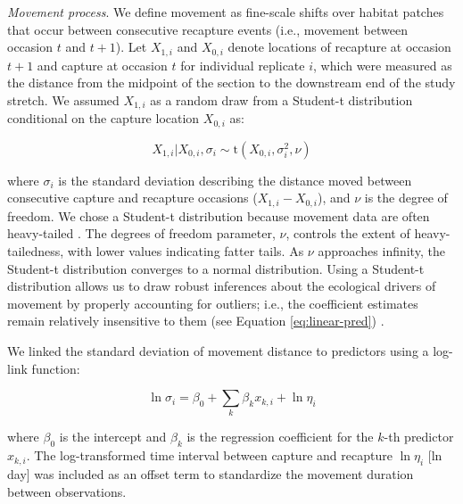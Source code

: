\documentclass[11pt, class=article, crop=false]{standalone}
\begin{document}
\textit{Movement process}. We define movement as fine-scale shifts over habitat patches that occur between consecutive recapture events (i.e., movement between occasion $t$ and $t+1$). Let $X_{1,i}$ and $X_{0,i}$ denote locations of recapture at occasion $t+1$ and capture at occasion $t$ for individual replicate $i$, which were measured as the distance from the midpoint of the section to the downstream end of the study stretch. We assumed $X_{1,i}$ as a random draw from a Student-t distribution conditional on the capture location $X_{0,i}$ as:    

\begin{equation}
    X_{1, i}|X_{0, i}, \sigma_i \sim \text{t}(X_{0, i}, \sigma_i^2, \nu)
    \label{eq:student-t}
\end{equation}

where $\sigma_i$ is the standard deviation describing the distance moved between consecutive capture and recapture occasions ($X_{1,i} - X_{0,i}$), and $\nu$ is the degree of freedom.
We chose a Student-t distribution because movement data are often heavy-tailed \citep{clobertDispersalEcologyEvolution2012}.
The degrees of freedom parameter, $\nu$, controls the extent of heavy-tailedness, with lower values indicating fatter tails. As $\nu$ approaches infinity, the Student-t distribution converges to a normal distribution.
Using a Student-t distribution allows us to draw robust inferences about the ecological drivers of movement by properly accounting for outliers; i.e., the coefficient estimates remain relatively insensitive to them (see Equation \ref{eq:linear-pred}) \citep{lunnBUGSBookPractical2012}.

We linked the standard deviation of  movement distance to predictors using a log-link function: 

\begin{equation}
    \ln \sigma_i = \beta_0 + \sum_{k} \beta_k x_{k,i} + \ln \eta_i
    \label{eq:linear-pred}
\end{equation}

where $\beta_0$ is the intercept and $\beta_k$ is the regression coefficient for the $k$-th predictor $x_{k,i}$. The log-transformed time interval between capture and recapture $\ln \eta_i$ [ln day] was included as an offset term to standardize the movement duration between observations.
\end{document}

